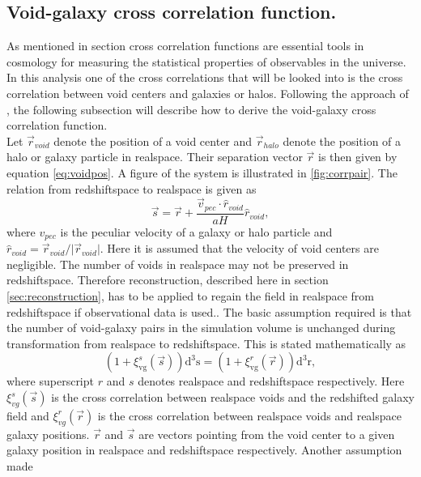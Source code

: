 \subsection{Void-galaxy cross correlation function.}\label{sec:vgcrosscorr}
As mentioned in section  cross correlation functions are
essential tools in cosmology for measuring the statistical properties of
observables in the universe. In this analysis one of the cross correlations that
will be looked into is the cross correlation between void centers and galaxies
or halos. Following the approach of \cite{Nadathur_corr}, the following
subsection will describe how to derive the void-galaxy cross correlation
function. 
\\\indent
Let $\vec{r}_{void}$ denote the position of a void center and $\vec{r}_{halo}$ denote the
position of a halo or galaxy particle in realspace. Their separation vector $\vec{r}$ is then
given by equation \ref{eq:voidpos}. A figure of the system is illustrated in \ref{fig:corrpair}. The relation from redshiftspace to realspace
is given as
\begin{equation}\label{eq:s_to_r}
    \vec{s}=\vec{r}+\frac{\vec{v}_{pec}\cdot\hat{r}_{void}}{aH}\hat{r}_{void},
\end{equation}
where $v_{pec}$ is the peculiar velocity of a galaxy or halo particle and
$\hat{r}_{void}=\vec{r}_{void}/ \vert \vec{r}_{void}\vert$. Here it is assumed
that the velocity of void centers are negligible. The number of voids in
realspace may not be preserved in redshiftspace. Therefore reconstruction,
described here in section \ref{sec:reconstruction}, has to be applied to regain
the field in realspace from redshiftspace if observational data is used.. The basic assumption
required is that the number of void-galaxy pairs in the simulation volume is
unchanged during transformation from realspace to redshiftspace. This is stated
mathematically as
\begin{equation}\label{eq:corr_void_start}
    (1 + \xi^s_{\mathrm{vg}}(\vec{s}))\mathrm{d}^3\mathrm{s}=(1 + \xi^r_{\mathrm{vg}}(\vec{r}))\mathrm{d}^3\mathrm{r},
\end{equation}
where superscript $r$ and $s$ denotes realspace and redshiftspace respectively.
Here $\xi^s_{vg}(\vec{s})$ is the cross correlation between realspace voids and
the redshifted galaxy field and $\xi^r_{vg}(\vec{r})$ is the cross correlation
between realspace voids and realspace galaxy positions. $\vec{r}$ and $\vec{s}$
are vectors pointing from the void center to a given galaxy position in
realspace and redshiftspace respectively. Another assumption made
